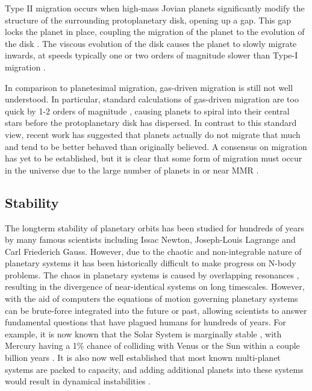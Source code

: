 Type II migration occurs when high-mass Jovian planets significantly modify the structure of the surrounding protoplanetary disk, opening up a gap. 
This gap locks the planet in place, coupling the migration of the planet to the evolution of the disk \citep{Lin1986}.
The viscous evolution of the disk causes the planet to slowly migrate inwards, at speeds typically one or two orders of magnitude slower than Type-I migration \citep{Ward1997}.

In comparison to planetesimal migration, gas-driven migration is still not well understood. 
In particular, standard calculations of gas-driven migration are too quick by 1-2 orders of magnitude \citep{Lin1986, Tanaka2002}, causing planets to spiral into their central stars before the protoplanetary disk has dispersed.
In contrast to this standard view, recent work \citep{Fung2017} has suggested that planets actually do not migrate that much and tend to be better behaved than originally believed. 
A consensus on migration has yet to be established, but it is clear that some form of migration must occur in the universe due to the large number of planets in or near MMR \citep{Lissauer2011,Fabrycky2014,Steffen2015}.

\subsection{Stability}
\label{sec:stability}
The longterm stability of planetary orbits has been studied for hundreds of years by many famous scientists including Issac Newton, Joseph-Louis Lagrange and Carl Friederich Gauss. 
However, due to the chaotic and non-integrable nature of planetary systems it has been historically difficult to make progress on N-body problems.  
The chaos in planetary systems is caused by overlapping resonances \citep{Chirikov1979, Lecar2001}, resulting in the divergence of near-identical systems on long timescales. 
However, with the aid of computers the equations of motion governing planetary systems can be brute-force integrated into the future or past, allowing scientists to answer fundamental questions that have plagued humans for hundreds of years. 
For example, it is now known that the Solar System is marginally stable \citep{Sussman1988, Laskar1994, Lecar2001}, with Mercury having a 1\% chance of colliding with Venus or the Sun within a couple billion years \citep{Laskar2009}.
It is also now well established that most known multi-planet systems are packed to capacity, and adding additional planets into these systems would result in dynamical instabilities \citep{Fang2013,Pu2015}.

